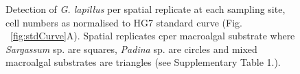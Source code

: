 \documentclass[12pt]{article}
\begin{document}
\FloatBarrier 
\begin{figure} 
\caption{Detection of \emph{G. lapillus} per spatial replicate at each sampling site, cell numbers as normalised to HG7 standard curve (Fig. ~\ref{fig:stdCurve}A). Spatial replicates cper macroalgal substrate where \emph{Sargassum} sp. are squares, \emph{Padina} sp. are circles and mixed macroalgal substrates are triangles (see Supplementary Table 1.).} 
\label{fig:envHG7}
\end{figure} 
\FloatBarrier



\newpage


\end{document}
